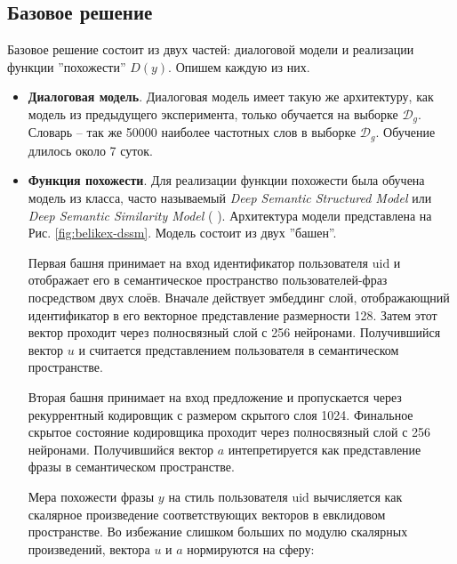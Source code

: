 \documentclass[12pt,a4paper]{amsart}
\begin{document}
\subsection{Базовое решение}

Базовое решение состоит из двух частей: диалоговой модели и реализации функции ''похожести'' $D(y)$. Опишем каждую из них.

\begin{itemize}
	\item \textbf{Диалоговая модель}. Диалоговая модель имеет такую же архитектуру, как модель из предыдущего эксперимента, только обучается на выборке $\mathcal{D}_g$. Словарь -- так же 50000 наиболее частотных слов в выборке $\mathcal{D}_g$. Обучение длилось около 7 суток.
	\item \textbf{Функция похожести}. Для реализации функции похожести была обучена модель из класса, часто называемый \textit{Deep Semantic Structured Model} или \textit{Deep Semantic Similarity Model} (\cite{semantic-parsing-for-single-relation-question-answering} \cite{learning-deep-structured-semantic-models-for-web-search-using-clickthrough-data} \cite{learning-continuous-phrase-representations-for-translation-modeling} \cite{learning-semantic-representations-using-convolutional-neural-networks-for-web-search} \cite{a-latent-semantic-model-with-convolutional-pooling-structure-for-information-retrieval}). Архитектура модели представлена на Рис. \ref{fig:belikex-dssm}. Модель состоит из двух ''башен''.
	
	Первая башня принимает на вход идентификатор пользователя $\text{uid}$ и отображает его в семантическое пространство пользователей-фраз посредством двух слоёв. Вначале действует эмбеддинг слой, отображающний идентификатор в его векторное представление размерности 128. Затем этот вектор проходит через полносвязный слой с 256 нейронами. Получившийся вектор $u$ и считается представлением пользователя в семантическом пространстве.
	
	Вторая башня принимает на вход предложение и пропускается через рекуррентный кодировщик с размером скрытого слоя 1024. Финальное скрытое состояние кодировщика проходит через полносвязный слой с 256 нейронами. Получившийся вектор $a$ интепретируется как представление фразы в семантическом пространстве.
	
	Мера похожести фразы $y$ на стиль пользователя $\text{uid}$ вычисляется как скалярное произведение соответствующих векторов в евклидовом пространстве. Во избежание слишком больших по модулю скалярных произведений, вектора $u$ и $a$ нормируются на сферу:
	

\end{itemize}
\end{document}
